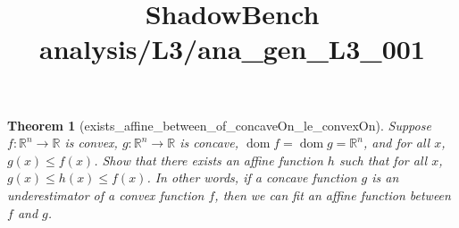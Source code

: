 \documentclass{article}
\title{ShadowBench analysis/L3/ana\_gen\_L3\_001}
\newtheorem{theorem}{Theorem}
\begin{document}
\maketitle

\begin{theorem}[exists_affine_between_of_concaveOn_le_convexOn]
Suppose $f : \mathbb{R}^n \to \mathbb{R}$ is convex, $g : \mathbb{R}^n \to \mathbb{R}$ is concave, $\operatorname{dom} f = \operatorname{dom} g = \mathbb{R}^n$, and for all $x$, $g(x) \le f(x)$. Show that there exists an affine function $h$ such that for all $x$, $g(x) \le h(x) \le f(x)$. In other words, if a concave function $g$ is an underestimator of a convex function $f$, then we can fit an affine function between $f$ and $g$.
\end{theorem}
\end{document}
